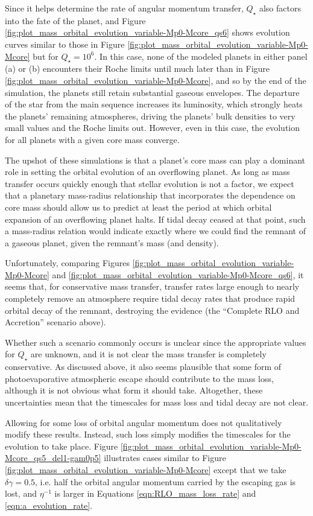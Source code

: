 \documentclass{svjour3}                     %
\begin{document}
Since it helps determine the rate of angular momentum transfer, $Q_\star$ also factors into the fate of the planet, and Figure \ref{fig:plot_mass_orbital_evolution_variable-Mp0-Mcore_qs6} shows evolution curves similar to those in Figure \ref{fig:plot_mass_orbital_evolution_variable-Mp0-Mcore} but for $Q_\star = 10^6$. In this case, none of the modeled planets in either panel (a) or (b) encounters their Roche limits until much later than in Figure \ref{fig:plot_mass_orbital_evolution_variable-Mp0-Mcore}, and so by the end of the simulation, the planets still retain substantial gaseous envelopes. The departure of the star from the main sequence increases its luminosity, which strongly heats the planets' remaining atmospheres, driving the planets' bulk densities to very small values and the Roche limits out. However, even in this case, the evolution for all planets with a given core mass converge. 

The upshot of these simulations is that a planet's core mass can play a dominant role in setting the orbital evolution of an overflowing planet. As long as mass transfer occurs quickly enough that stellar evolution is not a factor, we expect that a planetary mass-radius relationship that incorporates the dependence on core mass should allow us to predict at least the period at which orbital expansion of an overflowing planet halts. If tidal decay ceased at that point, such a mass-radius relation would indicate exactly where we could find the remnant of a gaseous planet, given the remnant's mass (and density).

Unfortunately, comparing Figures \ref{fig:plot_mass_orbital_evolution_variable-Mp0-Mcore} and \ref{fig:plot_mass_orbital_evolution_variable-Mp0-Mcore_qs6}, it seems that, for conservative mass transfer, transfer rates large enough to nearly completely remove an atmosphere require tidal decay rates that produce rapid orbital decay of the remnant, destroying the evidence (the ``Complete RLO and Accretion'' scenario above). 

Whether such a scenario commonly occurs is unclear since the appropriate values for $Q_\star$ are unknown, and it is not clear the mass transfer is completely conservative. As discussed above, it also seems plausible that some form of photoevaporative atmospheric escape should contribute to the mass loss, although it is not obvious what form it should take. Altogether, these uncertainties mean that the timescales for mass loss and tidal decay are not clear. 

Allowing for some loss of orbital angular momentum does not qualitatively modify these results. Instead, such loss simply modifies the timescales for the evolution to take place. Figure \ref{fig:plot_mass_orbital_evolution_variable-Mp0-Mcore_qs5_del1-gam0p5} illustrates cases similar to Figure \ref{fig:plot_mass_orbital_evolution_variable-Mp0-Mcore} except that we take $\delta \gamma = 0.5$, i.e. half the orbital angular momentum carried by the escaping gas is lost, and $\eta^{-1}$ is larger in Equations \ref{eqn:RLO_mass_loss_rate} and \ref{eqn:a_evolution_rate}.
\end{document}
